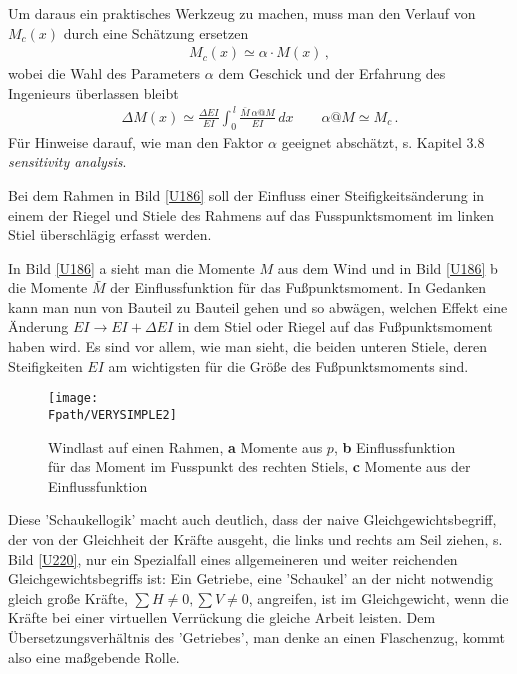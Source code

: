 {{{{Um daraus ein praktisches Werkzeug zu machen, muss man den Verlauf von $M_c(x)$ durch eine Sch\"{a}tzung ersetzen
\begin{align}
M_c(x) \simeq \alpha \cdot M(x)\,,
\end{align}
wobei die Wahl des Parameters $\alpha$ dem Geschick und der Erfahrung des Ingenieurs \"{u}berlassen bleibt
\begin{align}
\Delta M(x) \simeq \frac{\Delta EI}{EI} \int_0^{\,l} \frac{\bar{M}\,\alpha @ M}{EI}\,dx \qquad \alpha @ M \simeq M_c\,.
\end{align}
F\"{u}r Hinweise darauf, wie man den Faktor $\alpha$ geeignet absch\"{a}tzt, s. \cite{Ha5} Kapitel 3.8 {\em sensitivity analysis\/}.

Bei dem Rahmen in Bild   \ref{U186} soll der Einfluss einer Steifigkeits\"{a}nderung in einem der Riegel und Stiele des Rahmens auf das Fusspunktsmoment im linken Stiel \"{u}berschl\"{a}gig erfasst werden.


In Bild \ref{U186} a sieht man die Momente $M$ aus dem Wind und in Bild \ref{U186} b die Momente $\bar{M}$ der Einflussfunktion f\"{u}r das Fu{\ss}punktsmoment. In Gedanken kann man nun von Bauteil zu Bauteil gehen und so abw\"{a}gen, welchen Effekt eine \"{A}nderung $EI \to EI + \Delta EI$ in dem Stiel oder Riegel auf das Fu{\ss}punktsmoment haben wird. Es sind vor allem, wie man sieht, die beiden unteren Stiele, deren Steifigkeiten $EI$ am wichtigsten f\"{u}r die Gr\"{o}{\ss}e des Fu{\ss}punktsmoments sind.



\begin{figure}[tbp]
\texttt{[image: \\Fpath/VERYSIMPLE2]}
\caption{Windlast auf einen Rahmen, {\bf a} Momente aus $p$, {\bf b}
Einflussfunktion f\"{u}r das Moment im Fusspunkt des rechten Stiels, {\bf c}
Momente aus der Einflussfunktion} \label{VerySimple2}
\end{figure}%

\begin{remark}
Diese 'Schaukellogik' macht auch deutlich, dass der naive Gleichgewichtsbegriff, der von der Gleichheit der Kr\"{a}fte ausgeht, die links und rechts am Seil ziehen, s. Bild \ref{U220}, nur ein Spezialfall eines allgemeineren und weiter reichenden Gleichgewichtsbegriffs ist: Ein Getriebe, eine 'Schaukel' an der nicht notwendig gleich gro{\ss}e Kr\"{a}fte, $\sum H \neq 0, \sum V \neq 0$, angreifen, ist im Gleichgewicht, wenn die Kr\"{a}fte bei einer virtuellen Verr\"{u}ckung die gleiche Arbeit leisten. Dem \"{U}bersetzungsverh\"{a}ltnis des 'Getriebes', man denke an einen Flaschenzug, kommt also eine ma{\ss}gebende Rolle.


\end{remark}}}}}
